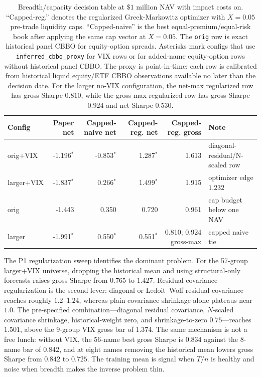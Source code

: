 \begin{table}[H]
\centering
\scriptsize
\begin{tabularx}{\textwidth}{L{0.9in}rrrrX}
\toprule
Config & Paper net & Capped-naive net & Capped-reg. net & Capped-reg. gross & Note \\
\midrule
orig+VIX & -1.196\(^\ast\) & -0.853\(^\ast\) & 1.287\(^\ast\) & 1.613 & diagonal-residual/N-scaled row \\
larger+VIX & -1.837\(^\ast\) & 0.266\(^\ast\) & 1.499\(^\ast\) & 1.915 & optimizer edge \(1.232\) \\
orig & -1.443 & 0.350 & 0.720 & 0.961 & cap budget below one NAV \\
larger & -1.991\(^\ast\) & 0.550\(^\ast\) & 0.551\(^\ast\) & 0.810; 0.924 gross-max & capped naive tie \\
\bottomrule
\end{tabularx}
\caption{Breadth/capacity decision table at \(\$1\) million NAV with impact costs on.
``Capped-reg.'' denotes the regularized Greek-Markowitz optimizer with \(X=0.05\)
pre-trade liquidity caps. ``Capped-naive'' is the best equal-premium/equal-risk book
after applying the same cap vector at \(X=0.05\). The \texttt{orig} row is exact historical
panel CBBO for equity-option spreads. Asterisks mark configs that use
\texttt{inferred\_cbbo\_proxy} for VIX rows or for added-name equity-option rows without
historical panel CBBO. The proxy is point-in-time: each row is calibrated from historical
liquid equity/ETF CBBO observations available no later than the decision date. For the
larger no-VIX configuration, the net-max regularized row has gross Sharpe \(0.810\),
while the gross-max regularized row has gross Sharpe \(0.924\) and net Sharpe \(0.530\).}
\label{tab:breadth_capacity_decision}
\end{table}

The P1 regularization sweep identifies the dominant problem. For the 57-group
larger+VIX universe, dropping the historical mean and using structural-only forecasts
raises gross Sharpe from \(0.765\) to \(1.427\). Residual-covariance regularization is the
second lever: diagonal or Ledoit--Wolf residual covariance reaches roughly \(1.2\)--\(1.24\),
whereas plain covariance shrinkage alone plateaus near \(1.0\). The pre-specified
combination---diagonal residual covariance, \(N\)-scaled covariance shrinkage,
historical-weight zero, and shrinkage-to-zero \(0.75\)---reaches \(1.501\), above the
9-group VIX gross bar of \(1.374\). The same mechanism is not a free lunch: without VIX,
the 56-name best gross Sharpe is \(0.834\) against the 8-name bar of \(0.842\), and at
eight names removing the historical mean lowers gross Sharpe from \(0.842\) to \(0.725\).
The training mean is signal when \(T/n\) is healthy and noise when breadth makes the
inverse problem thin.

